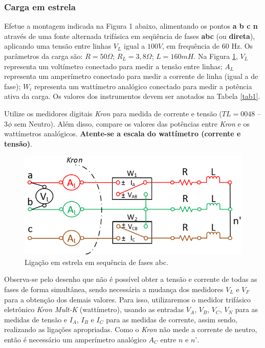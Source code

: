 \documentclass[a4paper,12pt,oneside,openany,table,xcdraw]{article}
\begin{document}
\subsubsection{Carga em estrela}
 Efetue a montagem indicada na Figura 1 abaixo, alimentando os pontos \textbf{a b c n} através de uma fonte alternada trifásica em seqüência de fases \textbf{abc} (ou \textbf{direta}), aplicando uma tensão entre linhas $V_L$ igual a $100 V$, em frequência de 60 Hz. Os parâmetros da carga são: $R = 50 \Omega$; $R_L = 3,8\Omega$; $L = 160 mH$. Na Figura \ref{fig1}, $V_L$ representa um voltímetro conectado para medir a tensão entre linhas; $A_L$ representa um amperímetro conectado para medir a corrente de linha (igual a de fase); $W_i$ representa um wattímetro analógico conectado para medir a potência ativa da carga. Os valores dos instrumentos devem ser anotados na Tabela \ref{tab1}.  

Utilize os medidores digitais \emph{Kron} para medida de corrente e tensão ($TL = 0048$ – $3\phi$ sem Neutro). Além disso, compare os valores das potências entre \emph{Kron} e os wattímetros analógicos. \textbf{Atente-se a escala do wattímetro (corrente e tensão)}. 
\begin{figure}[H]
\centering
\captionsetup{font=scriptsize}
\includegraphics[width=14cm]{fig1}
\caption{Ligação em estrela em sequência de fases abc.}
\label{fig1}
\end{figure}
Observa-se pelo desenho que não é possível obter a tensão e corrente de todas as fases de forma simultânea, sendo necessária a mudança dos medidores $V_L$ e $V_F$ para a obtenção dos demais valores. Para isso, utilizaremos o medidor trifásico eletrônico \textit{Kron Mult-K} (wattímetro),  usando as entradas $V_A$, $V_B$, $V_C$, $V_N$ para as medidas de tensão e $I_A$, $I_B$ e $I_C$ para as medidas de corrente, assim sendo, realizando as ligações apropriadas. Como o \textit{Kron} não mede a corrente de neutro, então é necessário um amperímetro analógico $A_C$ entre $n$ e $n’$.
\end{document}
